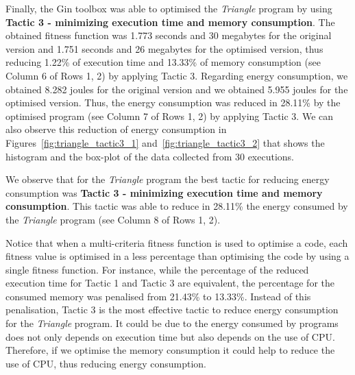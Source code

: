 \vspace{.5em}
Finally, the Gin toolbox was able to optimised the \textit{Triangle} program by using \textbf{Tactic 3 - minimizing execution time and memory consumption}. The obtained fitness function was 1.773 seconds and 30 megabytes for the original version and 1.751 seconds and 26 megabytes for the optimised version, thus reducing 1.22\% of execution time and 13.33\% of memory consumption (see Column 6 of Rows 1, 2) by applying Tactic 3. 
Regarding energy consumption, we obtained 8.282 joules for the original version and we obtained 5.955 joules for the optimised version. Thus, the energy consumption was reduced in 28.11\% by the optimised program (see Column 7 of Rows 1, 2) by applying Tactic 3.  
We can also observe this reduction of energy consumption in Figures~\ref{fig:triangle_tactic3_1} and~\ref{fig:triangle_tactic3_2} that shows the histogram and the box-plot of the data collected from 30 executions.

\vspace{.5em}
We observe that for the \textit{Triangle} program the best tactic for reducing energy consumption was \textbf{Tactic 3 - minimizing execution time and memory consumption}. This tactic was able to reduce in 28.11\% the energy consumed by the  \textit{Triangle} program (see Column 8 of Rows 1, 2).

\vspace{.5em}
Notice that when a multi-criteria fitness function is used to optimise a code, each fitness value is optimised in a less percentage than optimising the code by using a single fitness function. For instance, while the percentage of the reduced execution time for Tactic 1 and Tactic 3 are equivalent, the percentage for the consumed memory was penalised from 21.43\% to 13.33\%. Instead of this penalisation, Tactic 3 is the most effective tactic to reduce energy consumption for the \textit{Triangle} program. It could be due to the energy consumed by programs does not only depends on execution time but also depends on the use of CPU. Therefore, if we optimise the memory consumption it could help to reduce the use of CPU, thus reducing energy consumption.


